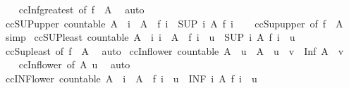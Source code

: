\begin{isabellebody}
%
\isadelimproof
\ \ %
\endisadelimproof
%
\isatagproof
{}\isamarkupfalse%
\ ccInf{\isacharunderscore}greatest\ {\isacharbrackleft}of\ {\isachardoublequoteopen}f\ {\isacharbackquote}\ A{\isachardoublequoteclose}{\isacharbrackright}\ \isamarkupfalse%
\ auto%
\endisatagproof
{\isafoldproof}%
%
\isadelimproof
\isanewline
%
\endisadelimproof
\isanewline
{}\isamarkupfalse%
\ ccSUP{\isacharunderscore}upper{\isacharcolon}\ {\isachardoublequoteopen}countable\ A\ {\isasymLongrightarrow}\ i\ {\isasymin}\ A\ {\isasymLongrightarrow}\ f\ i\ {\isasymle}\ {\isacharparenleft}SUP\ i\ {\isacharcolon}A{\isachardot}\ f\ i{\isacharparenright}{\isachardoublequoteclose}\isanewline
%
\isadelimproof
\ \ %
\endisadelimproof
%
\isatagproof
{}\isamarkupfalse%
\ ccSup{\isacharunderscore}upper\ {\isacharbrackleft}of\ {\isachardoublequoteopen}f\ {\isacharbackquote}\ A{\isachardoublequoteclose}{\isacharbrackright}\ \isamarkupfalse%
\ simp%
\endisatagproof
{\isafoldproof}%
%
\isadelimproof
\isanewline
%
\endisadelimproof
\isanewline
{}\isamarkupfalse%
\ ccSUP{\isacharunderscore}least{\isacharcolon}\ {\isachardoublequoteopen}countable\ A\ {\isasymLongrightarrow}\ {\isacharparenleft}{\isasymAnd}i{\isachardot}\ i\ {\isasymin}\ A\ {\isasymLongrightarrow}\ f\ i\ {\isasymle}\ u{\isacharparenright}\ {\isasymLongrightarrow}\ {\isacharparenleft}SUP\ i\ {\isacharcolon}A{\isachardot}\ f\ i{\isacharparenright}\ {\isasymle}\ u{\isachardoublequoteclose}\isanewline
%
\isadelimproof
\ \ %
\endisadelimproof
%
\isatagproof
{}\isamarkupfalse%
\ ccSup{\isacharunderscore}least\ {\isacharbrackleft}of\ {\isachardoublequoteopen}f\ {\isacharbackquote}\ A{\isachardoublequoteclose}{\isacharbrackright}\ \isamarkupfalse%
\ auto%
\endisatagproof
{\isafoldproof}%
%
\isadelimproof
\isanewline
%
\endisadelimproof
\isanewline
{}\isamarkupfalse%
\ ccInf{\isacharunderscore}lower{}{\isacharcolon}\ {\isachardoublequoteopen}countable\ A\ {\isasymLongrightarrow}\ u\ {\isasymin}\ A\ {\isasymLongrightarrow}\ u\ {\isasymle}\ v\ {\isasymLongrightarrow}\ Inf\ A\ {\isasymle}\ v{\isachardoublequoteclose}\isanewline
%
\isadelimproof
\ \ %
\endisadelimproof
%
\isatagproof
{}\isamarkupfalse%
\ ccInf{\isacharunderscore}lower\ {\isacharbrackleft}of\ A\ u{\isacharbrackright}\ \isamarkupfalse%
\ auto%
\endisatagproof
{\isafoldproof}%
%
\isadelimproof
\isanewline
%
\endisadelimproof
\isanewline
{}\isamarkupfalse%
\ ccINF{\isacharunderscore}lower{}{\isacharcolon}\ {\isachardoublequoteopen}countable\ A\ {\isasymLongrightarrow}\ i\ {\isasymin}\ A\ {\isasymLongrightarrow}\ f\ i\ {\isasymle}\ u\ {\isasymLongrightarrow}\ {\isacharparenleft}INF\ i\ {\isacharcolon}A{\isachardot}\ f\ i{\isacharparenright}\ {\isasymle}\ u{\isachardoublequoteclose}\isanewline

\end{isabellebody}

